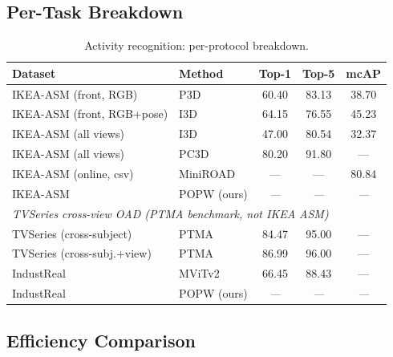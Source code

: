 \documentclass[11pt,a4paper]{article}
\newcommand{\popw}{POPW}
\newcommand{\ikea}{IKEA-ASM}
\newcommand{\industreal}{IndustReal}
\newcommand{\todo}{\textit{---}}
\newcommand{\popwres}{\todo}
\begin{document}
\subsection{Per-Task Breakdown}

\begin{table}[!htbp]
\centering
\small
\caption{Activity recognition: per-protocol breakdown.}
\label{tab:activity-breakdown}
\begin{tabular}{l l c c c}
\toprule
\textbf{Dataset} & \textbf{Method} & \textbf{Top-1} & \textbf{Top-5} & \textbf{mcAP} \\
\midrule
\ikea{} (front, RGB)    & P3D~\cite{benshabat2021ikea}                 & 60.40 & 83.13 & 38.70 \\
\ikea{} (front, RGB+pose) & I3D~\cite{benshabat2021ikea}               & 64.15 & 76.55 & 45.23 \\
\ikea{} (all views)     & I3D~\cite{benshabat2021ikea}                 & 47.00 & 80.54 & 32.37 \\
\ikea{} (all views)     & PC3D~\cite{aganian2023ikea}                  & 80.20 & 91.80 & --- \\
\ikea{} (online, csv)   & MiniROAD~\cite{an2023miniroad}                  & --- & --- & 80.84 \\
\ikea{}                 & \popw{} (ours)                               & \popwres & \popwres & \popwres \\
\midrule
\multicolumn{5}{l}{\textit{TVSeries cross-view OAD (PTMA benchmark, not IKEA ASM)~\cite{xie2025ptma}}} \\
TVSeries (cross-subject)       & PTMA                 & 84.47 & 95.00 & --- \\
TVSeries (cross-subj.+view)    & PTMA                 & 86.99 & 96.00 & --- \\
\midrule
\industreal{}           & MViTv2~\cite{schoonbeek2024industreal}       & 66.45 & 88.43 & --- \\
\industreal{}           & \popw{} (ours)                               & \popwres & \popwres & \popwres \\
\bottomrule
\end{tabular}
\end{table}

\FloatBarrier

\subsection{Efficiency Comparison}
\label{sec:efficiency}
\end{document}
